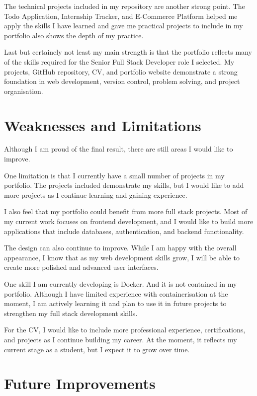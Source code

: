 \documentclass[12pt,a4paper]{article}
\begin{document}
The technical projects included in my repository are another strong point. The Todo Application, Internship Tracker, and E-Commerce Platform helped me apply the skills I have learned and gave me practical projects to include in my portfolio also shows the depth of my practice.

Last but certainely not least my main strength is that the portfolio reflects many of the skills required for the Senior Full Stack Developer role I selected. My projects, GitHub repository, CV, and portfolio website demonstrate a strong foundation in web development, version control, problem solving, and project organisation.


\section{Weaknesses and Limitations}

Although I am proud of the final result, there are still areas I would like to improve.

One limitation is that I currently have a small number of projects in my portfolio. The projects included demonstrate my skills, but I would like to add more projects as I continue learning and gaining experience.

I also feel that my portfolio could benefit from more full stack projects. Most of my current work focuses on frontend development, and I would like to build more applications that include databases, authentication, and backend functionality.

The design can also continue to improve. While I am happy with the overall appearance, I know that as my web development skills grow, I will be able to create more polished and advanced user interfaces.

One skill I am currently developing is Docker. And it is not contained in my portfolio. Although I have limited experience with containerisation at the moment, I am actively learning it and plan to use it in future projects to strengthen my full stack development skills.


For the CV, I would like to include more professional experience, certifications, and projects as I continue building my career. At the moment, it reflects my current stage as a student, but I expect it to grow over time.


\section{Future Improvements}
\end{document}
